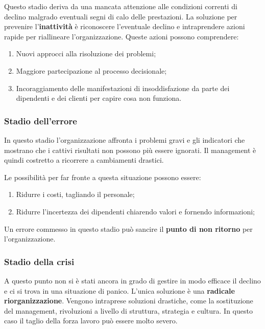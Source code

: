 \documentclass[14pt]{extarticle}
\begin{document}
Questo stadio deriva da una mancata attenzione alle condizioni correnti di
declino malgrado eventuali segni di calo delle prestazioni. La soluzione per
prevenire l'\textbf{inattività} è riconoscere l'eventuale declino e
intraprendere azioni rapide per riallineare l'organizzazione. Queste azioni
possono comprendere:

\begin{enumerate}
    \item Nuovi approcci alla risoluzione dei problemi;
    \item Maggiore partecipazione al processo decisionale;
    \item Incoraggiamento delle manifestazioni di insoddisfazione da parte dei
    dipendenti e dei clienti per capire cosa non funziona.   
\end{enumerate}

\subsubsection{Stadio dell'errore}

In questo stadio l'organizzazione affronta i problemi gravi e gli indicatori che
mostrano che i cattivi risultati non possono più essere ignorati. Il management
è quindi costretto a ricorrere a cambiamenti drastici.

Le possibilità per far fronte a questa situazione possono essere:

\begin{enumerate}
    \item Ridurre i costi, tagliando il personale;
    \item Ridurre l'incertezza dei dipendenti chiarendo valori e fornendo
    informazioni;  
\end{enumerate}

Un errore commesso in questo stadio può sancire il \textbf{punto di non ritorno}
per l'organizzazione.

\subsubsection{Stadio della crisi}

A questo punto non si è stati ancora in grado di gestire in modo efficace il
declino e ci si trova in una situazione di panico. L'unica soluzione è una
\textbf{radicale riorganizzazione}. Vengono intraprese soluzioni drastiche, come
la sostituzione del management, rivoluzioni a livello di struttura, strategia e
cultura. In questo caso il taglio della forza lavoro può essere molto severo.
\end{document}
